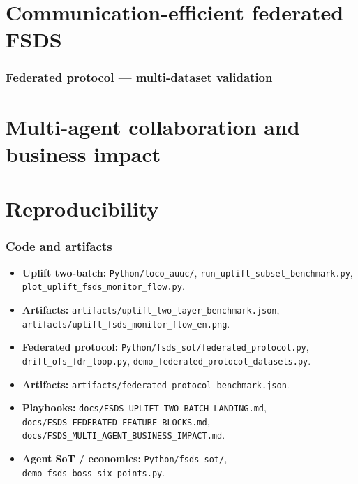 \documentclass[11pt]{article}
\begin{document}
\part{Communication-efficient federated FSDS}



\section{Federated protocol --- multi-dataset validation}


\part{Multi-agent collaboration and business impact}





\part{Reproducibility}

\section{Code and artifacts}
\begin{itemize}\itemsep3pt
  \item \textbf{Uplift two-batch:} \texttt{Python/loco\_auuc/}, \texttt{run\_uplift\_subset\_benchmark.py}, \texttt{plot\_uplift\_fsds\_monitor\_flow.py}.
  \item \textbf{Artifacts:} \texttt{artifacts/uplift\_two\_layer\_benchmark.json}, \texttt{artifacts/uplift\_fsds\_monitor\_flow\_en.png}.
  \item \textbf{Federated protocol:} \texttt{Python/fsds\_sot/federated\_protocol.py}, \texttt{drift\_ofs\_fdr\_loop.py}, \texttt{demo\_federated\_protocol\_datasets.py}.
  \item \textbf{Artifacts:} \texttt{artifacts/federated\_protocol\_benchmark.json}.
  \item \textbf{Playbooks:} \texttt{docs/FSDS\_UPLIFT\_TWO\_BATCH\_LANDING.md}, \texttt{docs/FSDS\_FEDERATED\_FEATURE\_BLOCKS.md}, \texttt{docs/FSDS\_MULTI\_AGENT\_BUSINESS\_IMPACT.md}.
  \item \textbf{Agent SoT / economics:} \texttt{Python/fsds\_sot/}, \texttt{demo\_fsds\_boss\_six\_points.py}.
\end{itemize}
\end{document}
